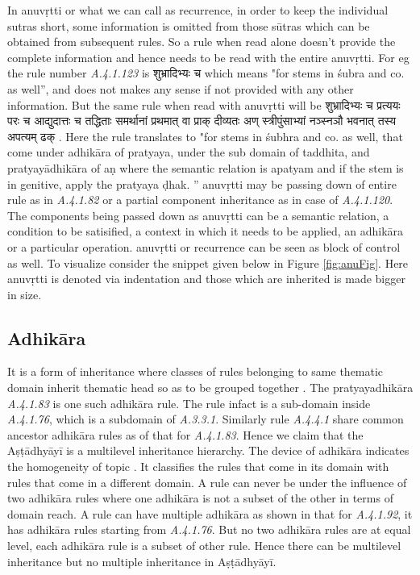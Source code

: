 \documentclass[a4paper,11pt,twoside,openright]{report}
\begin{document}
In anuvṛtti or what we can call as recurrence, in order to keep the individual sutras short,
some information is omitted from those sūtras which can be obtained from subsequent
rules. So a rule when read alone doesn’t provide the complete information and hence
needs to be read with the entire anuvṛtti. For eg the rule number \textsl{ A.4.1.123} is {\skt शुभ्रादिभ्यः च} which means "for stems in śubra and co. as well”, and does not makes any sense if not provided with any other information.  But the same rule when read with anuvṛtti will be {\skt शुभ्रादिभ्यः च प्रत्ययः परः च आद्युदात्तः च तद्धिताः समर्थानां प्रथमात् वा प्राक् दीव्यतः अण् स्त्रीपुंसाभ्यां नञ्स्नञौ भवनात् तस्य अपत्यम् ढक् }. Here the rule translates to "for stems in śubhra and co. as well, that come under adhikāra of
pratyaya, under the sub domain of taddhita, and pratyayādhikāra of aṇ where the semantic relation is apatyam and if the stem is in genitive, apply the pratyaya ḍhak. ” anuvṛtti may be passing down of
entire rule as in \textsl{ A.4.1.82} or a partial component inheritance as in case of \textsl{ A.4.1.120}. The components being passed down as anuvṛtti can be a semantic relation, a condition to be
satisified, a context in which it needs to be applied, an adhikāra or a particular operation. anuvṛtti or recurrence can be seen as block of control as well. To visualize consider the
snippet given below in Figure \ref{fig:anuFig}. Here anuvṛtti is denoted via indentation and those which are inherited is made bigger in size.

\subsection{Adhikāra}
It is a form of inheritance where classes of rules belonging to same thematic domain
inherit thematic head so as to be grouped together \cite{deo07}. The pratyayadhikāra \textsl{    A.4.1.83} is one such adhikāra rule. The rule infact is a sub-domain inside \textsl{ A.4.1.76}, which is a subdomain of \textsl{ A.3.3.1}. Similarly rule \textsl{ A.4.4.1} share common ancestor adhikāra rules as of that for \textsl{ A.4.1.83}. Hence we claim that the Aṣṭādhyāyī is a multilevel inheritance hierarchy. The device of adhikāra indicates the homogeneity of topic \cite{joshi1984fundamentals}. It classifies the rules that come in its domain with rules that come in a different domain. A rule can never be under the influence of two adhikāra rules where one adhikāra is not a subset of the other in terms of domain reach. A rule can have multiple adhikāra as shown in that for \textsl{ A.4.1.92}, it has adhikāra rules starting from \textsl{ A.4.1.76}. But no two adhikāra rules are at equal level, each adhikāra rule is a subset of other rule. Hence there can be multilevel inheritance but no multiple inheritance in Aṣṭādhyāyī.
\end{document}
